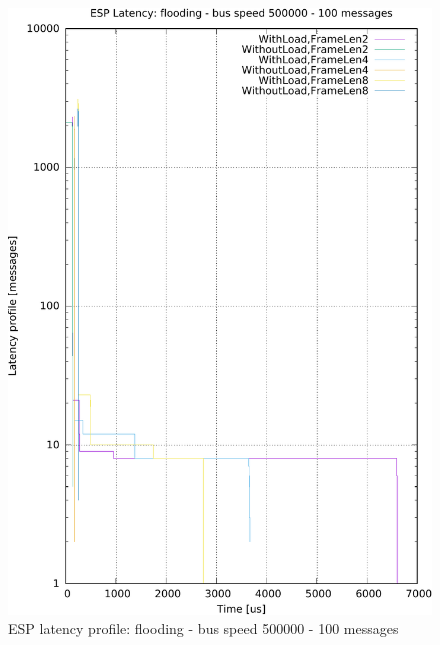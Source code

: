 \documentclass{ctuthesis}
\begin{document}
\begin{figure}[htb]
\includegraphics[width=\linewidth]{figures/speed500000_messages100_floodTrue.pdf}
\caption{ESP latency profile: flooding - bus speed 500000 - 100 messages}
\end{figure}
\end{document}
